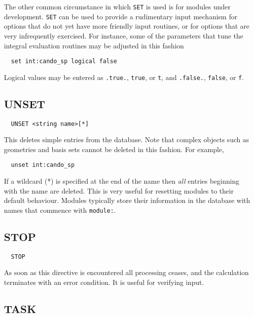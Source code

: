 The other common circumstance in which \verb+SET+ is used is for
modules under development.  \verb+SET+ can be used to provide a
rudimentary input mechanism for options that do not yet have more
friendly input routines, or for options that are very infrequently
exercised.  For instance, some of the parameters that tune the
integral evaluation routines may be adjusted in this fashion
\begin{verbatim}
  set int:cando_sp logical false
\end{verbatim}

Logical values may be entered as \verb+.true.+, \verb+true+, or
\verb+t+, and \verb+.false.+, \verb+false+, or \verb+f+.

\subsection{UNSET}
\label{sec:unset}

\begin{verbatim}
  UNSET <string name>[*]
\end{verbatim}

This deletes simple entries from the database.  Note that complex
objects such as geometries and basis sets cannot be deleted in this
fashion.  For example, 
\begin{verbatim}
  unset int:cando_sp
\end{verbatim}

If a wildcard (*) is specified at the end of the name then {\em all}
entries beginning with the name are deleted.  This is very useful for
resetting modules to their default behaviour.  Modules typically store
their information in the database with names that commence with
\verb+module:+.

\subsection{STOP}

\begin{verbatim}
  STOP
\end{verbatim}

As soon as this directive is encountered all processing ceases, and
the calculation terminates with an error condition.  It is useful for
verifying input.

\subsection{TASK}
\label{sec:task}

